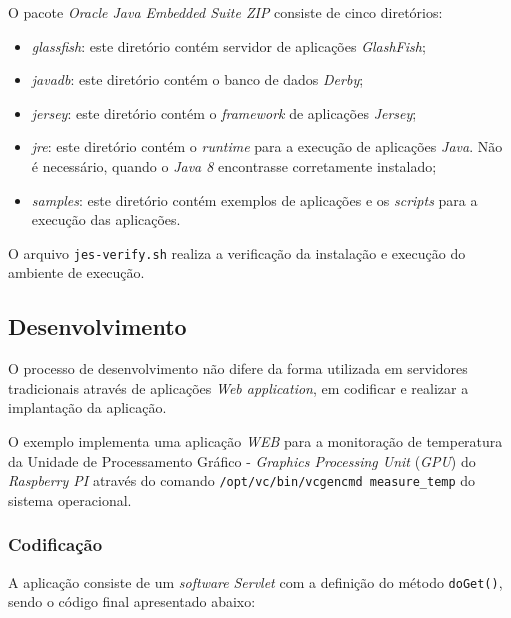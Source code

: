 O pacote \textit{Oracle Java Embedded Suite ZIP} consiste de cinco diretórios:

\begin{itemize}

    \item \textit{glassfish}: este diretório contém servidor de aplicações
    \textit{GlashFish};

    \item \textit{javadb}: este diretório contém o banco de dados
    \textit{Derby};

    \item \textit{jersey}: este diretório contém o \textit{framework} de
    aplicações \textit{Jersey};

    \item \textit{jre}: este diretório contém o \textit{runtime} para a
    execução de aplicações \textit{Java}. Não é necessário, quando o
    \textit{Java 8} encontrasse corretamente instalado;

    \item \textit{samples}: este diretório contém exemplos de aplicações e os
    \textit{scripts} para a execução das aplicações.

\end{itemize}

O arquivo \verb|jes-verify.sh| realiza a verificação da instalação e execução
do ambiente de execução.

\subsection{Desenvolvimento}

O processo de desenvolvimento não difere da forma utilizada em servidores
tradicionais através de aplicações \textit{Web application}, em codificar e
realizar a implantação da aplicação.

O exemplo implementa uma aplicação \textit{WEB} para a monitoração de
temperatura da Unidade de Processamento Gráfico - \textit{Graphics Processing
  Unit} (\textit{GPU}) do \textit{Raspberry PI} através do comando
\verb|/opt/vc/bin/vcgencmd measure_temp| do sistema operacional.

\subsubsection{Codificação}

A aplicação consiste de um \textit{software} \textit{Servlet} com a definição
do método \verb|doGet()|, sendo o código final apresentado abaixo:

